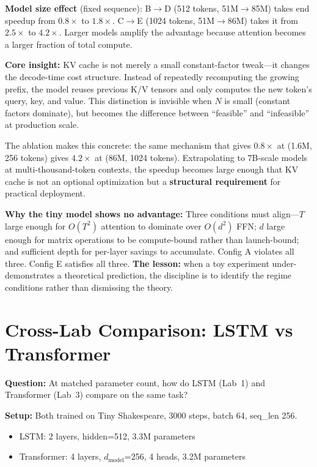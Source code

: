 \textbf{Model size effect} (fixed sequence): B$\to$D (512 tokens, 51M$\to$85M) takes end speedup from $0.8\times$ to $1.8\times$. C$\to$E (1024 tokens, 51M$\to$86M) takes it from $2.5\times$ to $4.2\times$. Larger models amplify the advantage because attention becomes a larger fraction of total compute.

\textbf{Core insight:} KV cache is not merely a small constant-factor tweak---it changes the decode-time cost structure. Instead of repeatedly recomputing the growing prefix, the model reuses previous K/V tensors and only computes the new token's query, key, and value. This distinction is invisible when $N$ is small (constant factors dominate), but becomes the difference between ``feasible'' and ``infeasible'' at production scale.

The ablation makes this concrete: the same mechanism that gives $0.8\times$ at (1.6M, 256 tokens) gives $4.2\times$ at (86M, 1024 tokens). Extrapolating to 7B-scale models at multi-thousand-token contexts, the speedup becomes large enough that KV cache is not an optional optimization but a \textbf{structural requirement} for practical deployment.

\textbf{Why the tiny model shows no advantage:} Three conditions must align---$T$ large enough for $O(T^2)$ attention to dominate over $O(d^2)$ FFN; $d$ large enough for matrix operations to be compute-bound rather than launch-bound; and sufficient depth for per-layer savings to accumulate. Config A violates all three. Config E satisfies all three. \textbf{The lesson:} when a toy experiment under-demonstrates a theoretical prediction, the discipline is to identify the regime conditions rather than dismissing the theory.

\section{Cross-Lab Comparison: LSTM vs Transformer}

\textbf{Question:} At matched parameter count, how do LSTM (Lab~1) and Transformer (Lab~3) compare on the same task?

\textbf{Setup:} Both trained on Tiny Shakespeare, 3000 steps, batch 64, seq\_len 256.
\begin{itemize}
\item LSTM: 2 layers, hidden=512, 3.3M parameters
\item Transformer: 4 layers, $d_\text{model}$=256, 4 heads, 3.2M parameters
\end{itemize}

